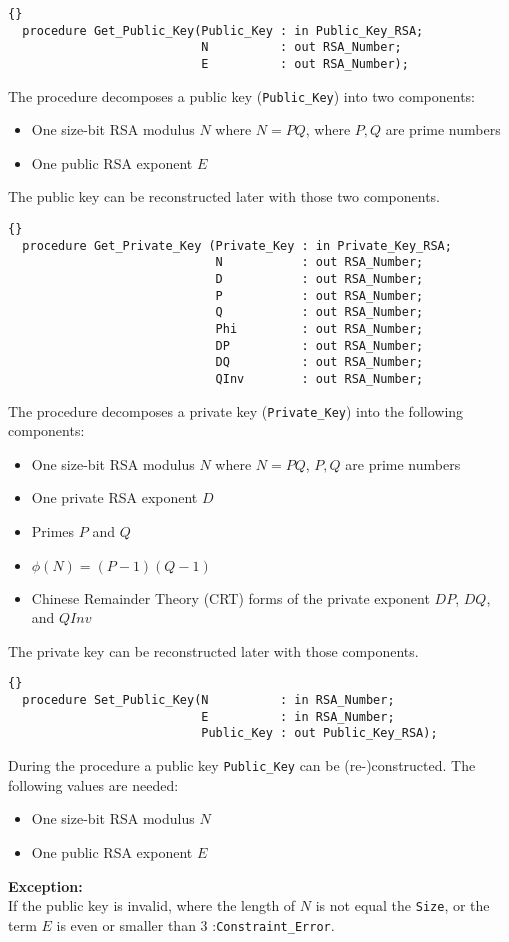 \hhline
\begin{lstlisting}{}
  procedure Get_Public_Key(Public_Key : in Public_Key_RSA;
                           N          : out RSA_Number;
                           E          : out RSA_Number);
\end{lstlisting}
The procedure decomposes a public key (\texttt{Public\_Key}) into two
components:
\begin{itemize}
\item One size-bit RSA modulus $N$ where $N=PQ$, where $P,Q$ are prime numbers
\item One public RSA exponent $E$
\end{itemize}
The public key can be reconstructed later with those two components.

\hhline
\begin{lstlisting}{}
  procedure Get_Private_Key (Private_Key : in Private_Key_RSA;
                             N           : out RSA_Number;
                             D           : out RSA_Number;
                             P           : out RSA_Number;
                             Q           : out RSA_Number;
                             Phi         : out RSA_Number;
                             DP          : out RSA_Number;
                             DQ          : out RSA_Number;
                             QInv        : out RSA_Number;
\end{lstlisting}
The procedure decomposes a private key (\texttt{Private\_Key}) into
the following components:
\begin{itemize}
\item One size-bit RSA modulus $N$ where $N=PQ$, $P,Q$ are prime numbers
\item One private RSA exponent $D$
\item Primes $P$ and $Q$
\item $\phi(N)=(P-1)(Q-1)$
\item Chinese Remainder Theory (CRT) forms of the private exponent $DP$, $DQ$, and $QInv$
\end{itemize}
The private key can be reconstructed later with those components.

\hhline
\begin{lstlisting}{}
  procedure Set_Public_Key(N          : in RSA_Number;
                           E          : in RSA_Number;
                           Public_Key : out Public_Key_RSA);
\end{lstlisting}
During the procedure a public key \texttt{Public\_Key} can be
(re-)constructed. The following values are needed:
\begin{itemize}
\item One size-bit RSA modulus $N$
\item One public RSA exponent $E$
\end{itemize}
\textbf{Exception:}\\
 If the public key is invalid, where the length
of $N$ is not equal the \texttt{Size}, or the term $E$ is even or
smaller than 3 :\quad \texttt{Constraint\_Error}.


